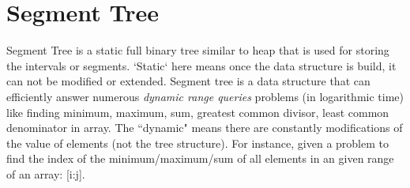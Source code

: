 \documentclass[../main.tex]{subfiles}
\begin{document}




\section{Segment Tree}
\label{sec_segment_tree}


Segment Tree is a static full binary tree similar to heap that is used for storing the intervals or segments. `Static` here means once the data structure is build, it can not be modified or extended.  Segment tree is a data structure that can efficiently answer numerous \textit{dynamic range queries} problems 
(in logarithmic time) like finding minimum, maximum, sum, greatest common divisor, least common denominator in array. The ``dynamic" means there are constantly modifications of the value of elements (not the tree structure).   For instance, given a problem to find the index of the minimum/maximum/sum of all elements in an given range of an array: [i:j]. 
\end{document}
